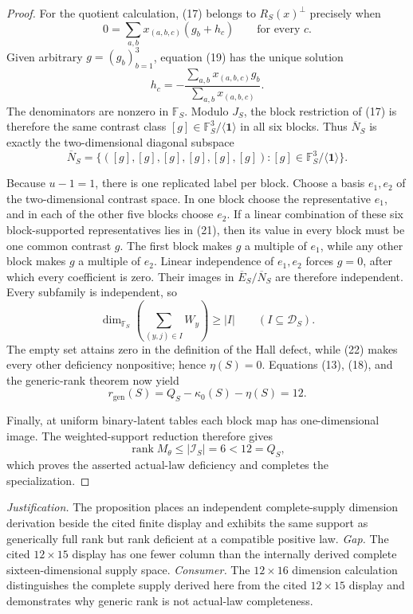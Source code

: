 \documentclass{article}
\begin{document}
\begin{proof}
For the quotient calculation, (17) belongs to \(R_S(x)^\perp\) precisely when
\[
0=\sum_{a,b}x_{(a,b,c)}(g_b+h_c)
\qquad\text{for every }c.
\tag{19}
\]
Given arbitrary \(g=(g_b)_{b=1}^3\), equation (19) has the unique solution
\[
h_c=-\frac{\sum_{a,b}x_{(a,b,c)}g_b}
{\sum_{a,b}x_{(a,b,c)}}.
\tag{20}
\]
The denominators are nonzero in \(\mathbb F_S\).  Modulo \(J_S\), the block restriction of (17) is therefore the same contrast class \([g]\in\mathbb F_S^3/\langle\mathbf1\rangle\) in all six blocks.  Thus \(\overline N_S\) is exactly the two-dimensional diagonal subspace
\[
\overline N_S
=\{([g],[g],[g],[g],[g],[g]):[g]\in\mathbb F_S^3/\langle\mathbf1\rangle\}.
\tag{21}
\]

Because \(u-1=1\), there is one replicated label per block.  Choose a basis \(e_1,e_2\) of the two-dimensional contrast space.  In one block choose the representative \(e_1\), and in each of the other five blocks choose \(e_2\).  If a linear combination of these six block-supported representatives lies in (21), then its value in every block must be one common contrast \(g\).  The first block makes \(g\) a multiple of \(e_1\), while any other block makes \(g\) a multiple of \(e_2\).  Linear independence of \(e_1,e_2\) forces \(g=0\), after which every coefficient is zero.  Their images in \(\overline E_S/\overline N_S\) are therefore independent.  Every subfamily is independent, so
\[
\dim_{\mathbb F_S}\left(\sum_{(y,j)\in I}W_y\right)\geq |I|
\qquad(I\subseteq\mathcal D_S).
\tag{22}
\]
The empty set attains zero in the definition of the Hall defect, while (22) makes every other deficiency nonpositive; hence \(\eta(S)=0\).  Equations (13), (18), and the generic-rank theorem now yield
\[
r_{\mathrm{gen}}(S)=Q_S-\kappa_0(S)-\eta(S)=12.
\tag{23}
\]

Finally, at uniform binary-latent tables each block map has one-dimensional image.  The weighted-support reduction therefore gives
\[
\operatorname{rank}M_\theta\leq|\mathcal I_S|=6<12=Q_S,
\tag{24}
\]
which proves the asserted actual-law deficiency and completes the specialization.
\end{proof}
\par\smallskip\noindent \textit{Justification.} The proposition places an independent complete-supply dimension derivation beside the cited finite display and exhibits the same support as generically full rank but rank deficient at a compatible positive law. \textit{Gap.} The cited \(12\times15\) display has one fewer column than the internally derived complete sixteen-dimensional supply space. \textit{Consumer.} The \(12\times16\) dimension calculation distinguishes the complete supply derived here from the cited \(12\times15\) display and demonstrates why generic rank is not actual-law completeness.
\end{document}
